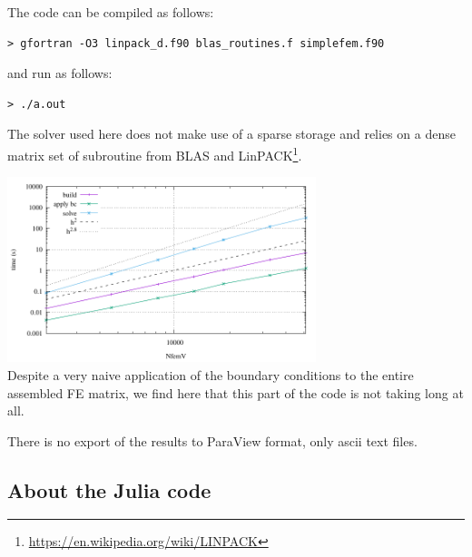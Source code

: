 The code can be compiled as follows:
\begin{verbatim}
> gfortran -O3 linpack_d.f90 blas_routines.f simplefem.f90
\end{verbatim}
and run as follows:
\begin{verbatim}
> ./a.out 
\end{verbatim}
The solver used here does not make use of a sparse storage and relies on a dense matrix 
set of subroutine from BLAS and LinPACK\footnote{\url{https://en.wikipedia.org/wiki/LINPACK}}.
\begin{center}
\includegraphics[width=9cm]{python_codes/fieldstone_01/simplefem/timings/timings.pdf}\\
{\captionfont Despite a very naive application of the boundary conditions to the entire
assembled FE matrix, we find here that this part of the code is not taking long at all.}
\end{center}
There is no export of the results to ParaView format, only ascii text files.



\newpage
\subsection*{About the Julia code}









